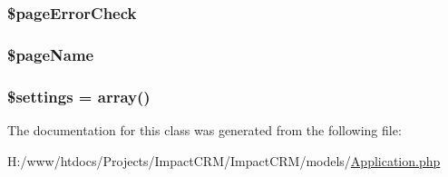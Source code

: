 \hypertarget{classApplication_ae82828f1344d1f882b81bb010cb9f17b}{
\subsubsection[{\$pageErrorCheck}]{\setlength{\rightskip}{0pt plus 5cm}\$pageErrorCheck}}
\label{classApplication_ae82828f1344d1f882b81bb010cb9f17b}
\hypertarget{classApplication_a6ca08dfcc239ba6bbe209515c2d3aec7}{
\subsubsection[{\$pageName}]{\setlength{\rightskip}{0pt plus 5cm}\$pageName}}
\label{classApplication_a6ca08dfcc239ba6bbe209515c2d3aec7}
\hypertarget{classApplication_ac7c3353107070daa85f641882931b358}{
\subsubsection[{\$settings}]{\setlength{\rightskip}{0pt plus 5cm}\$settings = array()}}
\label{classApplication_ac7c3353107070daa85f641882931b358}


The documentation for this class was generated from the following file:\begin{DoxyCompactItemize}
\item 
H:/www/htdocs/Projects/ImpactCRM/ImpactCRM/models/\hyperlink{Application_8php}{Application.php}\end{DoxyCompactItemize}

